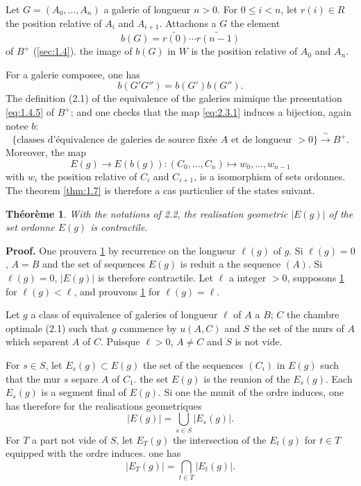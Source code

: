 \documentclass[11pt,a4paper]{article}
\theoremstyle{plain}
\newtheorem{theorem}{Th\'eor\`eme}[section]
\theoremstyle{definition}
\begin{document}
Let $G = (A_0, \ldots, A_n)$ a galerie of longueur $n > 0$. For $0 \leq i < n$, let $r(i) \in R$ the position relative of $A_i$ and $A_{i+1}$. Attachons a $G$ the element
\begin{equation}\label{eq:2.3.1}
b(G) = \widetilde{r(0)} \cdots \widetilde{r(n-1)}
\tag{2.3.1}
\end{equation}
of $B^+$ (\ref{sec:1.4}). the image of $b(G)$ in $W$ is the position relative of $A_0$ and $A_n$.

For a galerie composee, one has
\begin{equation}\label{eq:2.3.2}
b(G' G'') = b(G') b(G'').
\tag{2.3.2}
\end{equation}
The definition (2.1) of the equivalence of the galeries mimique the presentation \eqref{eq:1.4.5} of $B^+$; and one checks that the map \eqref{eq:2.3.1} induces a bijection, again notee $b$:
\begin{equation}\label{eq:2.3.3}
\{\text{classes d'\'equivalence de galeries de source fix\'ee } A \text{ et de longueur } > 0\} \xrightarrow{\;\sim\;} B^+.
\tag{2.3.3}
\end{equation}
Moreover, the map
\[
E(g) \to E(b(g)) : (C_0, \ldots, C_n) \mapsto w_0, \ldots, w_{n-1}
\]
with $w_i$ the position relative of $C_i$ and $C_{i+1}$, is a isomorphism of sets ordonnes. The theorem \ref{thm:1.7} is therefore a cas particulier of the states suivant.

\begin{theorem}\label{thm:2.4}
With the notations of 2.2, the realisation geometric $|E(g)|$ of the set ordonne $E(g)$ is contractile.
\end{theorem}

\noindent\textbf{Proof.} One prouvera \ref{thm:2.4} by recurrence on the longueur $\ell(g)$ of $g$. Si $\ell(g) = 0$, $A = B$ and the set of sequences $E(g)$ is reduit a the sequence $(A)$. Si $\ell(g) = 0$, $|E(g)|$ is therefore contractile. Let $\ell$ a integer $> 0$, supposons \ref{thm:2.4} for $\ell(g) < \ell$, and prouvons \ref{thm:2.4} for $\ell(g) = \ell$.

Let $g$ a class of equivalence of galeries of longueur $\ell$ of $A$ a $B$; $C$ the chambre optimale (2.1) such that $g$ commence by $u(A,C)$ and $S$ the set of the murs of $A$ which separent $A$ of $C$. Puisque $\ell > 0$, $A \not= C$ and $S$ is not vide.

For $s \in S$, let $E_s(g) \subset E(g)$ the set of the sequences $(C_i)$ in $E(g)$ such that the mur $s$ separe $A$ of $C_1$. the set $E(g)$ is the reunion of the $E_s(g)$. Each $E_s(g)$ is a segment final of $E(g)$. Si one the munit of the ordre induces, one has therefore for the realisations geometriques
\begin{equation}\label{eq:2.4.1}
|E(g)| = \bigcup_{s \in S} |E_s(g)|.
\tag{2.4.1}
\end{equation}
For $T$ a part not vide of $S$, let $E_T(g)$ the intersection of the $E_t(g)$ for $t \in T$ equipped with the ordre induces. one has
\begin{equation}\label{eq:2.4.2}
|E_T(g)| = \bigcap_{t \in T} |E_t(g)|.
\tag{2.4.2}
\end{equation}
\end{document}
